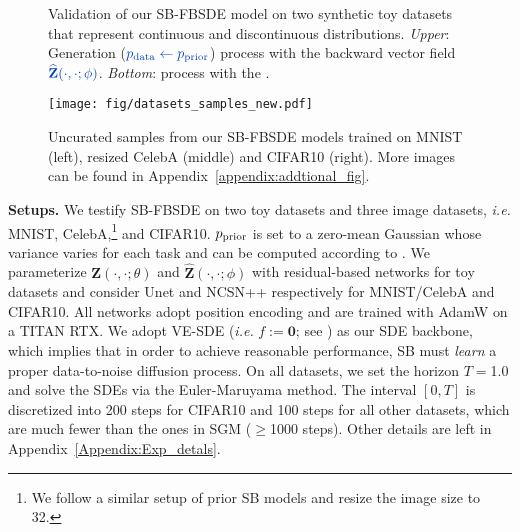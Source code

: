 \documentclass{article}
\def\rvZ{{\mathbf{Z}}}
\newcommand{\pdata}{p_{\rm{data}}}
\newcommand{\ie}{{\ignorespaces\emph{i.e.}}{ }}
\newcommand{\markblue}[1]{{\ignorespaces\color{color5} #1}}
\newcommand{\markred}[1]{\ignorespaces{\color{color3} #1}}
\begin{document}
\begin{figure}[H]
  \vskip -0.28in
  \begin{minipage}{\textwidth}
    \centering
    \captionsetup[subfloat]{captionskip=1pt}
    \hfill
    \vskip -0.1in
    \caption{
      Validation of our SB-FBSDE model on two synthetic toy datasets that represent continuous and discontinuous distributions.
      \textit{Upper}:
      \markblue{Generation ($\color{color5} \pdata \leftarrow \prior$)} process with the
      \markblue{backward vector field $\color{color5} \widehat{\rvZ}(\cdot,\cdot;\phi)$}.
      \textit{Bottom}:
      \markred{Diffusion ($\color{color3} \pdata \rightarrow \prior$)} process with the
      \markred{forward vector field $\color{color3} {\rvZ}(\cdot,\cdot;\theta)$}.
    }\label{fig:toy}\end{minipage}
  \vskip 0.05in
  \begin{minipage}{\textwidth}
    \centering
    \texttt{[image: fig/datasets\_samples\_new.pdf]}
    \vskip -0.1in
    \caption{
        Uncurated samples from our SB-FBSDE models trained on MNIST (left), resized CelebA (middle) and CIFAR10 (right).
        More images can be found in Appendix~\ref{appendix:addtional_fig}.
    }
    \label{fig:all_datasets}
  \end{minipage}
  \vskip -0.1in
\end{figure}


\textbf{Setups.}
We testify SB-FBSDE on
two toy datasets and three image datasets, \ie
MNIST, CelebA,\footnote{
  We follow a similar setup of prior SB models \citep{de2021diffusion} and resize the image size to 32.
} and CIFAR10.
${ p_\text{\normalfont{prior}} }$ is set to a zero-mean Gaussian whose variance varies for each task and can be computed according to \citet{song2020improved}.
We parameterize ${\rvZ}(\cdot,\cdot;\theta)$ and $\widehat{\rvZ}(\cdot,\cdot;\phi)$ with residual-based networks for toy datasets and consider
Unet \citep{ronneberger2015u} and NCSN++ \citep{song2020score} respectively for MNIST/CelebA and CIFAR10.
All networks adopt position encoding and are trained with AdamW \citep{loshchilov2017decoupled} on a TITAN RTX.
We adopt VE-SDE (\ie $f:=\mathbf{0}$; see \citet{song2020score})
as our SDE backbone,
which implies that in order to achieve reasonable performance,
SB must \textit{learn} a proper data-to-noise diffusion process.
On all datasets,
we set the horizon $T=$1.0
and solve the SDEs via the Euler-Maruyama method.
The interval $[0,T]$ is discretized into 200 steps for CIFAR10 and 100 steps for all other datasets,
which are much fewer than the ones in SGM ($\ge$1000 steps).
Other details are left in Appendix~\ref{Appendix:Exp_detals}.
\end{document}

